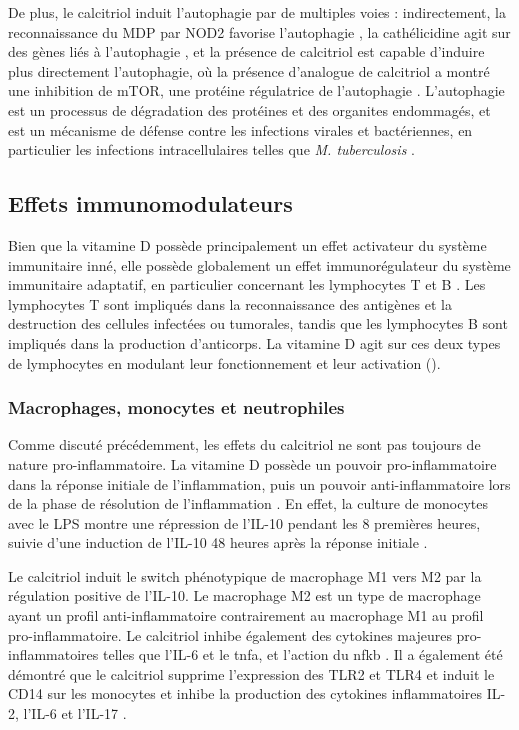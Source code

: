 \documentclass[
  a4paper,
  DIV=11,
  numbers=noendperiod,
  listof=totoc]{scrreprt}
\begin{document}
De plus, le calcitriol induit l'autophagie par de multiples voies :
indirectement, la reconnaissance du \ac{MDP} par NOD2 favorise
l'autophagie \autocite{Bishop.2021}, la cathélicidine agit sur des gènes
liés à l'autophagie \autocite{Yuk.2009}, et la présence de calcitriol
est capable d'induire plus directement l'autophagie, où la présence
d'analogue de calcitriol a montré une inhibition de mTOR, une protéine
régulatrice de l'autophagie \autocite{Yuk.2009}. L'autophagie est un
processus de dégradation des protéines et des organites endommagés, et
est un mécanisme de défense contre les infections virales et
bactériennes, en particulier les infections intracellulaires telles que
\emph{M. tuberculosis} \autocite{Liu.2006}.

\subsection{Effets immunomodulateurs}\label{sec-immunomodulateur}

Bien que la vitamine D possède principalement un effet activateur du
système immunitaire inné, elle possède globalement un effet
immunorégulateur du système immunitaire adaptatif, en particulier
concernant les lymphocytes T et B \autocite{Bishop.2021}. Les
lymphocytes T sont impliqués dans la reconnaissance des antigènes et la
destruction des cellules infectées ou tumorales, tandis que les
lymphocytes B sont impliqués dans la production d'anticorps. La vitamine
D agit sur ces deux types de lymphocytes en modulant leur fonctionnement
et leur activation ().

\subsubsection{Macrophages, monocytes et
neutrophiles}\label{macrophages-monocytes-et-neutrophiles}

Comme discuté précédemment, les effets du calcitriol ne sont pas
toujours de nature pro-inflammatoire. La vitamine D possède un pouvoir
pro-inflammatoire dans la réponse initiale de l'inflammation, puis un
pouvoir anti-inflammatoire lors de la phase de résolution de
l'inflammation \autocite{Dankers.2017}. En effet, la culture de
monocytes avec le \ac{LPS} montre une répression de l'\ac{IL-10} pendant
les 8 premières heures, suivie d'une induction de l'IL-10 48 heures
après la réponse initiale \autocite{Matilainen.2010}.

Le calcitriol induit le switch phénotypique de macrophage M1 vers M2 par
la régulation positive de l'\ac{IL-10}. Le macrophage M2 est un type de
macrophage ayant un profil anti-inflammatoire contrairement au
macrophage M1 au profil pro-inflammatoire. Le calcitriol inhibe
également des cytokines majeures pro-inflammatoires telles que
l'\ac{IL-6} et le \ac{tnfa}, et l'action du \ac{nfkb}
\autocite{Meza-Meza.2022,Caprio.2017}. Il a également été démontré que
le calcitriol supprime l'expression des \ac{TLR}2 et \ac{TLR}4 et induit
le CD14 sur les monocytes \autocite{Bishop.2021} et inhibe la production
des cytokines inflammatoires \ac{IL-2}, l'\ac{IL-6} et l'\ac{IL-17}
\autocite{Meza-Meza.2022,Caprio.2017}.
\end{document}
